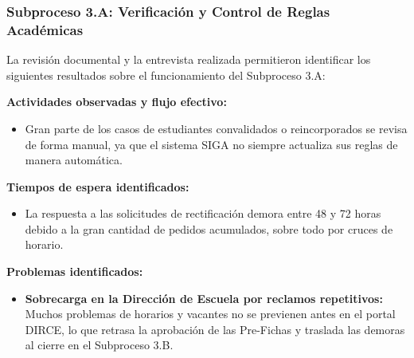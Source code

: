 \subsubsection{Subproceso 3.A: Verificación y Control de Reglas Académicas}

La revisión documental y la entrevista realizada permitieron identificar los siguientes resultados sobre el funcionamiento del Subproceso 3.A:

\textbf{Actividades observadas y flujo efectivo:}
\begin{itemize}
    \item Gran parte de los casos de estudiantes convalidados o reincorporados se revisa de forma manual, ya que el sistema SIGA no siempre actualiza sus reglas de manera automática.
\end{itemize}

\textbf{Tiempos de espera identificados:}
\begin{itemize}
    \item La respuesta a las solicitudes de rectificación demora entre 48 y 72 horas debido a la gran cantidad de pedidos acumulados, sobre todo por cruces de horario.
\end{itemize}

\textbf{Problemas identificados:}
\begin{itemize}
    \item \textbf{Sobrecarga en la Dirección de Escuela por reclamos repetitivos:} Muchos problemas de horarios y vacantes no se previenen antes en el portal DIRCE, lo que retrasa la aprobación de las Pre-Fichas y traslada las demoras al cierre en el Subproceso 3.B.
\end{itemize}